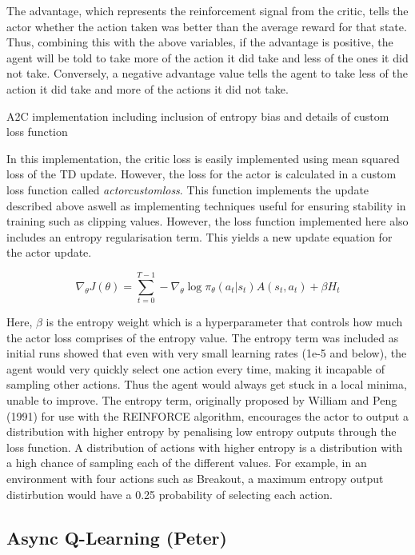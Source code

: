 \documentclass{article}
\begin{document}
The advantage, which represents the reinforcement signal from the critic, tells the actor whether the action taken was better than the average reward for that state. Thus, combining this with the above variables, if the advantage is positive, the agent will be told to take more of the action it did take and less of the ones it did not take. Conversely, a negative advantage value tells the agent to take less of the action it did take and more of the actions it did not take.

A2C implementation including inclusion of entropy bias and details of custom loss function

In this implementation, the critic loss is easily implemented using mean squared loss of the TD update. However, the loss for the actor is calculated in a custom loss function called \emph{actorcustomloss}. This function implements the update described above aswell as implementing techniques useful for ensuring stability in training such as clipping values. However, the loss function implemented here also includes an entropy regularisation term. This yields a new update equation for the actor update.


\begin{equation}
\nabla_{\theta} J(\theta) = \sum_{t=0}^{T-1}-\nabla_{\theta}\log{\pi_{\theta}}(a_{t} | s_{t}) A(s_{t}, a_{t}) + \beta H_{t}
\end{equation}

Here, $\beta$ is the entropy weight which is a hyperparameter that controls how much the actor loss comprises of the entropy value. The entropy term was included as initial runs showed that even with very small learning rates (1e-5 and below), the agent would very quickly select one action every time, making it incapable of sampling other actions. Thus the agent would always get stuck in a local minima, unable to improve. The entropy term, originally proposed by William and Peng (1991) for use with the REINFORCE algorithm, encourages the actor to output a distribution with higher entropy by penalising low entropy outputs through the loss function. A distribution of actions with higher entropy is a distribution with a high chance of sampling each of the different values. For example, in an environment with four actions such as Breakout, a maximum entropy output distirbution would have a 0.25 probability of selecting each action.

\subsection{Async Q-Learning (Peter)}
\end{document}
